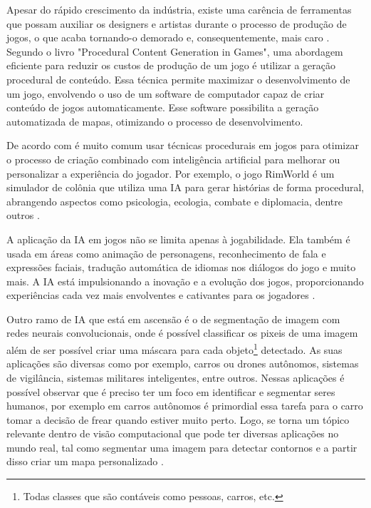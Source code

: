 Apesar do rápido crescimento da indústria, existe uma carência de ferramentas que possam auxiliar os designers e artistas durante o processo de produção de jogos, o que acaba tornando-o demorado e, consequentemente, mais caro \cite{geracao_procedural_artigo}. Segundo o livro "Procedural Content Generation in Games"\space\cite{procedural_centent_book}, uma abordagem eficiente para reduzir os custos de produção de um jogo é utilizar a geração procedural de conteúdo. Essa técnica permite maximizar o desenvolvimento de um jogo, envolvendo o uso de um software de computador capaz de criar conteúdo de jogos automaticamente. Esse software possibilita a geração automatizada de mapas, otimizando o processo de desenvolvimento.


De acordo com  é muito comum usar técnicas procedurais em jogos para otimizar o processo de criação combinado com inteligência artificial para melhorar ou personalizar a experiência do jogador. Por exemplo, o jogo RimWorld é um simulador de colônia que utiliza uma IA para gerar histórias de forma procedural, abrangendo aspectos como psicologia, ecologia, combate e diplomacia, dentre outros \cite{jogo_procedural}.

A aplicação da IA em jogos não se limita apenas à jogabilidade. Ela também é usada em áreas como animação de personagens, reconhecimento de fala e expressões faciais, tradução automática de idiomas nos diálogos do jogo e muito mais. A IA está impulsionando a inovação e a evolução dos jogos, proporcionando experiências cada vez mais envolventes e cativantes para os jogadores \cite{exameNvidia, omniverseace}.

Outro ramo de IA que está em ascensão é o de segmentação de imagem com redes neurais convolucionais, onde é possível classificar os pixeis de uma imagem além de ser possível criar uma máscara  para cada objeto\footnote{Todas classes que são contáveis como pessoas, carros, etc.} detectado. As suas aplicações são diversas como por exemplo, carros ou drones autônomos, sistemas de vigilância, sistemas militares inteligentes, entre outros. Nessas aplicações é possível observar que é preciso ter um foco em identificar e segmentar seres humanos, por exemplo em carros autônomos é primordial essa tarefa para o carro tomar a decisão de frear quando estiver muito perto. Logo, se torna um tópico relevante dentro de visão computacional que pode ter diversas aplicações no mundo real, tal como segmentar uma imagem para detectar contornos e a partir disso criar um mapa personalizado \cite{kirillov2019panoptic, dp_semantic_segmantation}.

